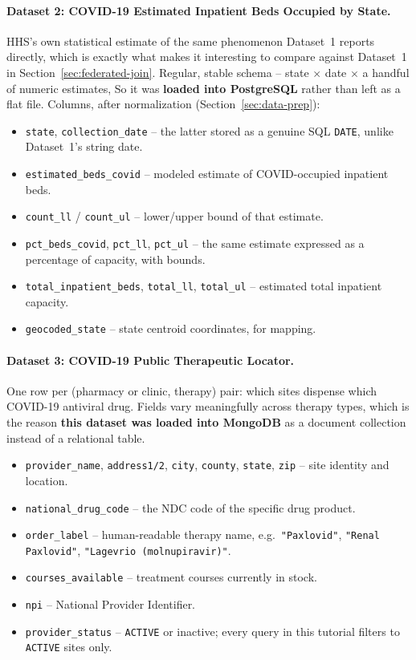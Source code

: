 \documentclass[11pt,a4paper]{article}
\begin{document}
\paragraph{Dataset 2: COVID-19 Estimated Inpatient Beds Occupied by State.}
HHS's own statistical estimate of the same phenomenon Dataset~1 reports directly,
which is exactly what makes it interesting to compare against Dataset~1 in
Section~\ref{sec:federated-join}. Regular, stable schema -- state $\times$ date
$\times$ a handful of numeric estimates,  So it was\textbf{ loaded into PostgreSQL} rather
than left as a flat file. Columns, after normalization (Section~\ref{sec:data-prep}):
\begin{itemize}[leftmargin=1.6em]
  \item \texttt{state}, \texttt{collection\_date} -- the latter stored as a genuine
    SQL \texttt{DATE}, unlike Dataset~1's string date.
  \item \texttt{estimated\_beds\_covid} -- modeled estimate of COVID-occupied
    inpatient beds.
  \item \texttt{count\_ll} / \texttt{count\_ul} -- lower/upper bound of that estimate.
  \item \texttt{pct\_beds\_covid}, \texttt{pct\_ll}, \texttt{pct\_ul} -- the same
    estimate expressed as a percentage of capacity, with bounds.
  \item \texttt{total\_inpatient\_beds}, \texttt{total\_ll}, \texttt{total\_ul} --
    estimated total inpatient capacity.
  \item \texttt{geocoded\_state} -- state centroid coordinates, for mapping.
\end{itemize}

\paragraph{Dataset 3: COVID-19 Public Therapeutic Locator.}
One row per (pharmacy or clinic, therapy) pair: which sites dispense which COVID-19
antiviral drug. Fields vary meaningfully across therapy types, which is the reason
\textbf{this dataset was loaded into MongoDB }as a document collection instead of a relational
table.
\begin{itemize}[leftmargin=1.6em]
  \item \texttt{provider\_name}, \texttt{address1/2}, \texttt{city}, \texttt{county},
    \texttt{state}, \texttt{zip} -- site identity and location.
  \item \texttt{national\_drug\_code} -- the NDC code of the specific drug product.
  \item \texttt{order\_label} -- human-readable therapy name, e.g.\ \texttt{"Paxlovid"},
    \texttt{"Renal Paxlovid"}, \texttt{"Lagevrio (molnupiravir)"}.
  \item \texttt{courses\_available} -- treatment courses currently in stock.
  \item \texttt{npi} -- National Provider Identifier.
  \item \texttt{provider\_status} -- \texttt{ACTIVE} or inactive; every query in this
    tutorial filters to \texttt{ACTIVE} sites only.
\end{itemize}
\end{document}
